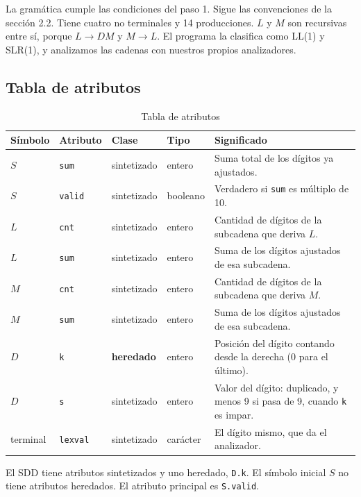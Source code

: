 \documentclass[11pt,a4paper]{article}
\begin{document}
La gramática cumple las condiciones del paso 1. Sigue las convenciones de la sección 2.2. Tiene cuatro no terminales y 14 producciones. $L$ y $M$ son recursivas entre sí, porque $L\to DM$ y $M\to L$. El programa la clasifica como LL(1) y SLR(1), y analizamos las cadenas con nuestros propios analizadores.

\subsection{Tabla de atributos}
\begin{table}[ht]
\centering\small
\begin{tabular}{llllp{6.2cm}}
\toprule
Símbolo & Atributo & Clase & Tipo & Significado \\
\midrule
$S$ & \texttt{sum} & sintetizado & entero & Suma total de los dígitos ya ajustados. \\
$S$ & \texttt{valid} & sintetizado & booleano & Verdadero si \texttt{sum} es múltiplo de 10. \\
$L$ & \texttt{cnt} & sintetizado & entero & Cantidad de dígitos de la subcadena que deriva $L$. \\
$L$ & \texttt{sum} & sintetizado & entero & Suma de los dígitos ajustados de esa subcadena. \\
$M$ & \texttt{cnt} & sintetizado & entero & Cantidad de dígitos de la subcadena que deriva $M$. \\
$M$ & \texttt{sum} & sintetizado & entero & Suma de los dígitos ajustados de esa subcadena. \\
$D$ & \texttt{k} & \textbf{heredado} & entero & Posición del dígito contando desde la derecha (0 para el último). \\
$D$ & \texttt{s} & sintetizado & entero & Valor del dígito: duplicado, y menos 9 si pasa de 9, cuando \texttt{k} es impar. \\
terminal & \texttt{lexval} & sintetizado & carácter & El dígito mismo, que da el analizador. \\
\bottomrule
\end{tabular}
\caption{Tabla de atributos}
\end{table}

El SDD tiene atributos sintetizados y uno heredado, \texttt{D.k}. El símbolo inicial $S$ no tiene atributos heredados. El atributo principal es \texttt{S.valid}.
\end{document}
